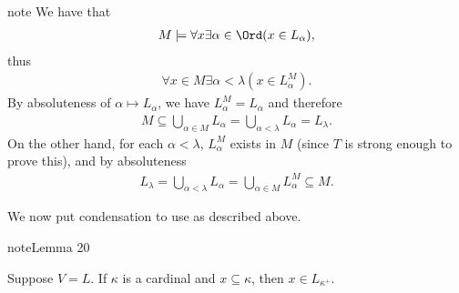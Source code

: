 \documentclass[letterpaper,10pt,english]{jupyterBook}
\begin{document}
\begin{sphinxadmonition}{note}
\sphinxAtStartPar
We have that
\begin{equation*}
\begin{split}
    M\models \forall x \exists \alpha\in \Ord (x \in L_\alpha),
\end{split}
\end{equation*}
\sphinxAtStartPar
thus
\begin{equation*}
\begin{split}
    \forall x \in M  \exists \alpha < \lambda (x \in L^M_\alpha).
\end{split}
\end{equation*}
\sphinxAtStartPar
By absoluteness of \(\alpha \mapsto L_\alpha\), we have \(L^M_\alpha = L_\alpha\) and therefore
\begin{equation*}
\begin{split}
    M \subseteq \bigcup_{\alpha \in M} L_\alpha =  \bigcup_{\alpha < \lambda} L_\alpha = L_\lambda.
\end{split}
\end{equation*}
\sphinxAtStartPar
On the other hand, for each \(\alpha < \lambda\), \(L_\alpha^M\) exists in \(M\) (since \(T\) is strong enough to prove this), and by absoluteness
\begin{equation*}
\begin{split}
  L_\lambda =   \bigcup_{\alpha < \lambda} L_\alpha =  \bigcup_{\alpha \in M} L^M_\alpha \subseteq M.
\end{split}
\end{equation*}\end{sphinxadmonition}

\sphinxAtStartPar
We now put condensation to use as described above.
\label{V=L:lemma-L-GCH}
\begin{sphinxadmonition}{note}{Lemma 20}



\sphinxAtStartPar
Suppose \(V=L\). If \(\kappa\) is a cardinal and \(x \subseteq \kappa\), then \(x \in L_{\kappa^+}\).
\end{sphinxadmonition}
\end{document}
